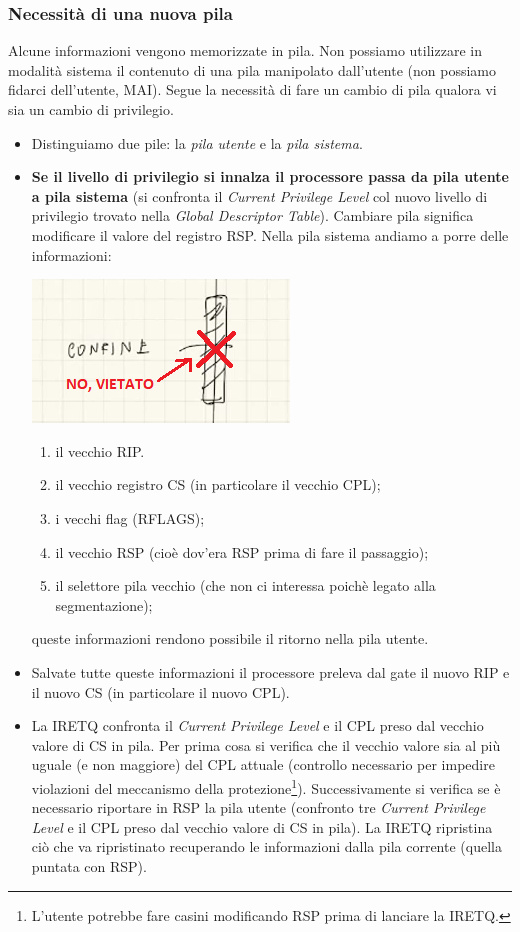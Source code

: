 \subsubsection{Necessità di una nuova pila}
Alcune informazioni vengono memorizzate in pila. Non possiamo utilizzare in modalità sistema il contenuto di una pila manipolato dall'utente (non possiamo fidarci dell'utente, MAI). Segue la necessità di fare un cambio di pila qualora vi sia un cambio di privilegio.\begin{itemize}
	\item Distinguiamo due pile: la \emph{pila utente} e la \emph{pila sistema}.
	\item \textbf{Se il livello di privilegio si innalza il processore passa da pila utente a pila sistema} (si confronta il \emph{Current Privilege Level} col nuovo livello di privilegio trovato nella \emph{Global Descriptor Table}). Cambiare pila significa modificare il valore del registro RSP. Nella pila sistema andiamo a porre delle informazioni: 
	\begin{center}
		\includegraphics[scale=.8]{img/283.PNG}
	\end{center}
	\begin{enumerate}
		\item il vecchio RIP.
		\item il vecchio registro CS (in particolare il vecchio CPL);
		\item i vecchi flag (RFLAGS);
		\item il vecchio RSP (cioè dov'era RSP prima di fare il passaggio);
		\item il selettore pila vecchio (che non ci interessa poichè legato alla segmentazione);
	\end{enumerate}
	queste informazioni rendono possibile il ritorno nella pila utente.
	\item Salvate tutte queste informazioni il processore preleva dal gate il nuovo RIP e il nuovo CS (in particolare il nuovo CPL). 
	\item La IRETQ confronta il \emph{Current Privilege Level} e il CPL preso dal vecchio valore di CS in pila. Per prima cosa si verifica che il vecchio valore sia al più uguale (e non maggiore) del CPL attuale (controllo necessario per impedire violazioni del meccanismo della protezione\footnote{L'utente potrebbe fare casini modificando RSP prima di lanciare la IRETQ.}). Successivamente si verifica se è necessario riportare in RSP la pila utente (confronto tre \emph{Current Privilege Level} e il CPL preso dal vecchio valore di CS in pila). La IRETQ ripristina ciò che va ripristinato recuperando le informazioni dalla pila corrente (quella puntata con RSP). 
\end{itemize}
